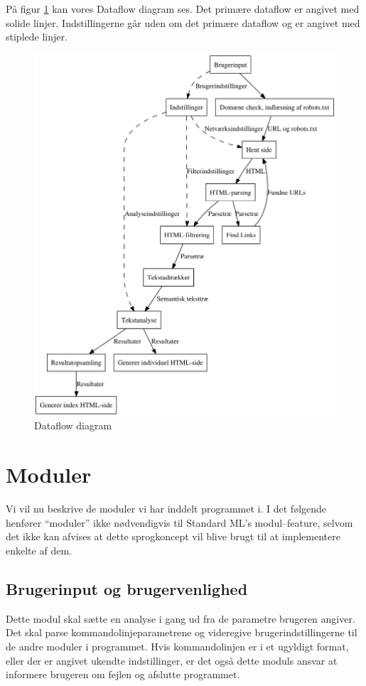 \documentclass[a4paper,oneside]{memoir}
\begin{document}
På figur \ref{dataflowdia} kan vores Dataflow diagram ses. Det primære
dataflow er angivet med solide linjer. Indstillingerne går uden om det
primære dataflow og er angivet med stiplede linjer.
\begin{figure}
  \includegraphics[width=\textwidth]{endeligtdesignill.pdf}
  \caption{Dataflow diagram}
  \label{dataflowdia}
\end{figure}

\newpage
\section{Moduler}
Vi vil nu beskrive de moduler vi har inddelt programmet i. I det
følgende henfører ``moduler'' ikke nødvendigvis til Standard ML's
modul--feature, selvom det ikke kan afvises at dette sprogkoncept vil
blive brugt til at implementere enkelte af dem.

\subsection{Brugerinput og brugervenlighed}
Dette modul skal sætte en analyse i gang ud fra de parametre brugeren
angiver. Det skal parse kommandolinjeparametrene og videregive
brugerindstillingerne til de andre moduler i programmet. Hvis
kommandolinjen er i et ugyldigt format, eller der er angivet ukendte
indstillinger, er det også dette moduls ansvar at informere brugeren
om fejlen og afslutte programmet.
\end{document}

